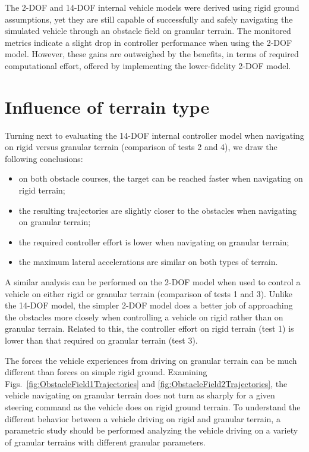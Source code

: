 \documentclass[12pt,onecolumn]{report}
\begin{document}
The 2-DOF and 14-DOF internal vehicle models were derived using rigid ground assumptions, yet they are still capable of successfully and safely navigating the simulated vehicle through an obstacle field on granular terrain. The monitored metrics indicate a slight drop in controller performance when using the 2-DOF model. However, these gains are outweighed by the benefits, in terms of required computational effort, offered by implementing the lower-fidelity 2-DOF model. 

\section{Influence of terrain type}

Turning next to evaluating the 14-DOF internal controller model when navigating on rigid versus granular terrain (comparison of tests 2 and 4), we draw the following conclusions:
\begin{itemize}
\item on both obstacle courses, the target can be reached faster when navigating on rigid terrain;
\item the resulting trajectories are slightly closer to the obstacles when navigating on granular terrain;
\item the required controller effort is lower when navigating on granular terrain;
\item the maximum lateral accelerations are similar on both types of terrain.
\end{itemize}

A similar analysis can be performed on the 2-DOF model when used to control a vehicle on either rigid or granular terrain (comparison of tests 1 and 3). Unlike the 14-DOF model, the simpler 2-DOF model does a better job of approaching the obstacles more closely when controlling a vehicle on rigid rather than on granular terrain. Related to this, the controller effort on rigid terrain (test 1) is lower than that required on granular terrain (test 3). 


The forces the vehicle experiences from driving on granular terrain can be much different than forces on simple rigid ground. Examining Figs.~\ref{fig:ObstacleField1Trajectories} and \ref{fig:ObstacleField2Trajectories}, the vehicle navigating on granular terrain does not turn as sharply for a given steering command as the vehicle does on rigid ground terrain. To understand the different behavior between a vehicle driving on rigid and granular terrain, a parametric study should be performed analyzing the vehicle driving on a variety of granular terrains with different granular parameters. 
\end{document}

